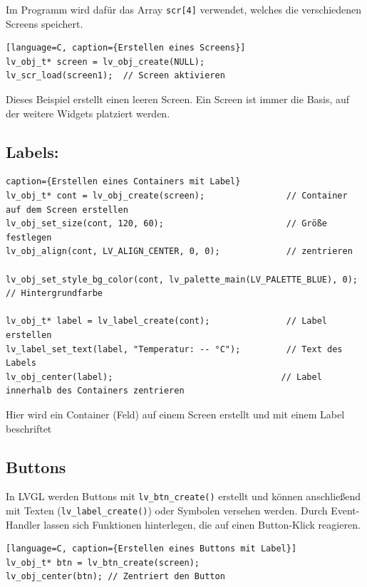 \begin{inhalt}
Im Programm wird dafür das Array \texttt{scr[4]} verwendet, welches die verschiedenen Screens speichert.

\begin{lstlisting}[style=mytsx][language=C, caption={Erstellen eines Screens}]
lv_obj_t* screen = lv_obj_create(NULL);
lv_scr_load(screen1);  // Screen aktivieren
\end{lstlisting}

Dieses Beispiel erstellt einen leeren Screen. Ein Screen ist immer die Basis, auf der weitere Widgets platziert werden.


\subsection{Labels:}

\begin{lstlisting}[style=mytsx] caption={Erstellen eines Containers mit Label}
lv_obj_t* cont = lv_obj_create(screen);                // Container auf dem Screen erstellen
lv_obj_set_size(cont, 120, 60);                        // Größe festlegen
lv_obj_align(cont, LV_ALIGN_CENTER, 0, 0);             // zentrieren

lv_obj_set_style_bg_color(cont, lv_palette_main(LV_PALETTE_BLUE), 0); // Hintergrundfarbe

lv_obj_t* label = lv_label_create(cont);               // Label erstellen
lv_label_set_text(label, "Temperatur: -- °C");         // Text des Labels
lv_obj_center(label);                                 // Label innerhalb des Containers zentrieren
\end{lstlisting}

Hier wird ein Container (Feld) auf einem Screen erstellt und mit einem Label beschriftet

\subsection{Buttons}

In LVGL werden Buttons mit \texttt{lv\_btn\_create()} erstellt und können anschließend mit Texten (\texttt{lv\_label\_create()}) oder Symbolen versehen werden. Durch Event-Handler lassen sich Funktionen hinterlegen, die auf einen Button-Klick reagieren.

\begin{lstlisting}[style=mytsx][language=C, caption={Erstellen eines Buttons mit Label}]
lv_obj_t* btn = lv_btn_create(screen);
lv_obj_center(btn); // Zentriert den Button


\end{lstlisting}
\end{inhalt}
